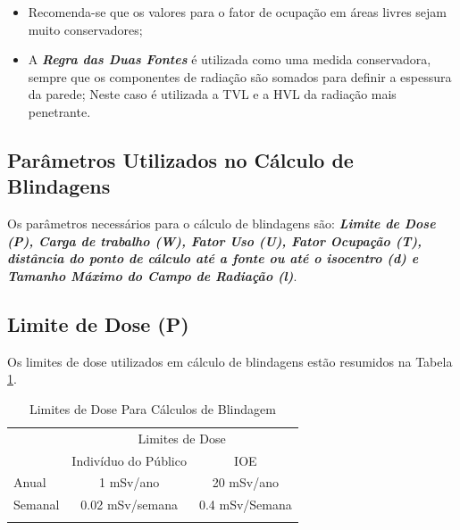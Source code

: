 \documentclass[11pt,a4paper]{article}
\begin{document}
\begin{itemize}
                    \textcolor{CarnationPink}{\textbf{Obs:}} Para fins de cálculos de blindagem, assume uma radiação de fuga de 0.1\% ou 1/100;
                
                \item Recomenda-se que os valores para o fator de ocupação em áreas livres sejam muito conservadores;
                \item A \textbf{\textit{\textcolor{CarnationPink}{Regra das Duas Fontes}}} é utilizada como uma medida conservadora, sempre que os componentes de radiação são somados para definir a espessura da parede; Neste caso é utilizada a TVL e a HVL da radiação mais penetrante.
            \end{itemize}

        \subsection{Parâmetros Utilizados no Cálculo de Blindagens}

            Os parâmetros necessários para o cálculo de blindagens são: \textbf{\textit{Limite de Dose (P), Carga de trabalho (W), Fator Uso (U), Fator Ocupação (T), distância do ponto de cálculo até a fonte ou até o isocentro (d) e Tamanho Máximo do Campo de Radiação (l)}}.

        \subsection*{\textcolor{CarnationPink}{Limite de Dose (P)}}

            Os limites de dose utilizados em cálculo de blindagens estão resumidos na Tabela \ref{tb:limitesDoseCalculoBlindagem}.

            \begin{table}[h]
                \centering
                \caption{Limites de Dose Para Cálculos de Blindagem}
                \label{tb:limitesDoseCalculoBlindagem}
                \begin{tabular}{l  c c}
                    \toprule
                     & \multicolumn{2}{c}{Limites de Dose} \\
                     \addlinespace[6pt]
                     & Indivíduo do Público & IOE \\
                     \cmidrule{2-3}
                     \addlinespace[6pt]
                     Anual &  1 mSv/ano & 20 mSv/ano \\
                     \addlinespace[6pt]
                     Semanal & 0.02 mSv/semana & 0.4 mSv/Semana \\
                     \addlinespace[5pt]
                     \hline
                     \hline
                \end{tabular}
            \end{table}
\end{document}
